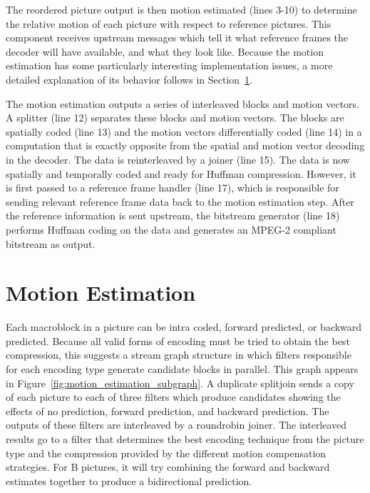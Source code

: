 The reordered picture output is then motion estimated (lines 3-10) 
to determine the relative motion of each picture with respect to 
reference pictures. This component receives upstream messages which 
tell it what reference frames the decoder will have available, 
and what they look like.
Because the motion estimation has some particularly interesting 
implementation issues, a more detailed explanation of its behavior 
follows in Section~\ref{encoder:estimation}.

The motion estimation outputs a series of interleaved blocks and 
motion vectors. A splitter (line 12) separates these blocks and 
motion vectors. The blocks are spatially coded (line 13) and the 
motion vectors differentially coded (line 14) in a computation that 
is exactly opposite from the spatial and motion vector decoding 
in the decoder. The data is reinterleaved by a joiner (line 15). The 
data is now spatially and temporally coded and ready for Huffman 
compression. However, it is first passed to a reference frame 
handler (line 17), which is responsible for sending relevant 
reference frame data back to the motion estimation step. After the 
reference information is sent upstream, the bitstream generator (line 18)
performs Huffman coding on the data and generates an 
MPEG-2 compliant bitstream as output.

\section{Motion Estimation}
\label{encoder:estimation}
 
Each macroblock in a picture can be intra coded, 
forward predicted, or backward predicted. 
Because all valid forms of encoding must be tried to obtain 
the best compression, this suggests a stream graph structure 
in which filters responsible for each encoding type generate 
candidate blocks in parallel. This graph appears in 
Figure~\ref{fig:motion_estimation_subgraph}. A duplicate 
splitjoin sends a copy of each picture to each of three 
filters which produce candidates showing the effects of no 
prediction, forward prediction, and backward prediction. The 
outputs of these filters are interleaved by a roundrobin joiner. 
The interleaved results go to a filter that determines the 
best encoding technique from the picture type and the 
compression provided by the different motion compensation 
strategies. For B pictures, it will try combining the 
forward and backward estimates together to produce a 
bidirectional prediction. 


